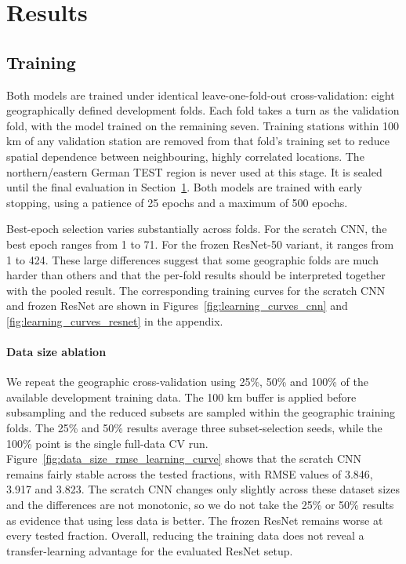 \documentclass[english, a4paper]{article}
\begin{document}
\section{Results}
\label{sec:results}

\subsection{Training}

Both models are trained under identical leave-one-fold-out cross-validation: eight geographically defined development folds. Each fold takes a turn as the validation fold, with the model trained on the remaining seven. Training stations within 100 km of any validation station are removed from that fold's training set to reduce spatial dependence between neighbouring, highly correlated locations. The northern/eastern German TEST region is never used at this stage. It is sealed until the final evaluation in Section~\ref{sec:results}. Both models are trained with early stopping, using a patience of 25 epochs and a maximum of 500 epochs.

Best-epoch selection varies substantially across folds. For the scratch CNN, the best epoch ranges from 1 to 71. For the frozen ResNet-50 variant, it ranges from 1 to 424. These large differences suggest that some geographic folds are much harder than others and that the per-fold results should be interpreted together with the pooled result. The corresponding training curves for the scratch CNN and frozen ResNet are shown in Figures~\ref{fig:learning_curves_cnn} and \ref{fig:learning_curves_resnet} in the appendix.


\paragraph{Data size ablation}
We repeat the geographic cross-validation using 25\%, 50\% and 100\% of the available development training data. The 100 km buffer is applied before subsampling and the reduced subsets are sampled within the geographic training folds. The 25\% and 50\% results average three subset-selection seeds, while the 100\% point is the single full-data CV run. Figure~\ref{fig:data_size_rmse_learning_curve} shows that the scratch CNN remains fairly stable across the tested fractions, with RMSE values of 3.846, 3.917 and 3.823. The scratch CNN changes only slightly across these dataset sizes and the differences are not monotonic, so we do not take the 25\% or 50\% results as evidence that using less data is better. The frozen ResNet remains worse at every tested fraction. Overall, reducing the training data does not reveal a transfer-learning advantage for the evaluated ResNet setup.
\end{document}
